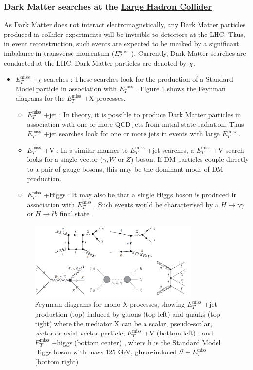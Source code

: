 \documentclass[11pt,a4paper,openright,twoside]{report}
\newcommand{\met}{$E_T^{\mathrm{miss}}$ }
\begin{document}
\subsubsection{Dark Matter searches at the \hyperref[ch:LHC]{Large Hadron Collider}}

As Dark Matter does not interact electromagnetically, any Dark Matter particles produced in collider experiments will be invisible to detectors at the LHC. Thus, in event reconstruction, such events are expected to be marked by a significant imbalance in transverse momentum (\met). Currently, Dark Matter searches are conducted at the LHC\cite{DM_searches}. Dark Matter particles are denoted by $\chi$.
\begin{itemize}
\item \met$+\chi$ searches : These searches look for the production of a Standard Model particle in association with \met. Figure \ref{fig:Mono_X} shows the Feynman diagrams for the \met +X processes.
	\begin{itemize}
	\item \met +jet : In theory, it is possible to produce Dark Matter particles in association with one or more QCD jets from initial state radiation. Thus \met +jet searches look for one or more jets in events with large \met.
	\item \met +V : In a similar manner to \met +jet searches, a \met +V search looks for a single vector ($\gamma,W$ or $Z$) boson. If DM particles couple directly to a pair of gauge bosons, this may be the dominant mode of DM production.
	\item \met +Higgs : It may also be that a single Higgs boson is produced in association with \met. Such events would be characterised by a $H\to\gamma\gamma$ or $H\to bb$ final state.
	\end{itemize}
	
\begin{figure}[H]
\centering
\includegraphics[width=0.8\textwidth]{Mono_X.png}
\caption{Feynman diagrams for mono X processes, showing \met +jet production (top) induced by gluons (top left) and quarks (top right) \cite{mono_j} where the mediator X can be a scalar, pseudo-scalar, vector or axial-vector particle; \met +V (bottom left) \cite{mono_V}; and \met +higgs (bottom center) \cite{mono_h}, where h is the Standard Model Higgs boson with mass 125 GeV; gluon-induced $t\bar{t}+$\met (bottom right)}
\label{fig:Mono_X}
\end{figure}


\end{itemize}
\end{document}
